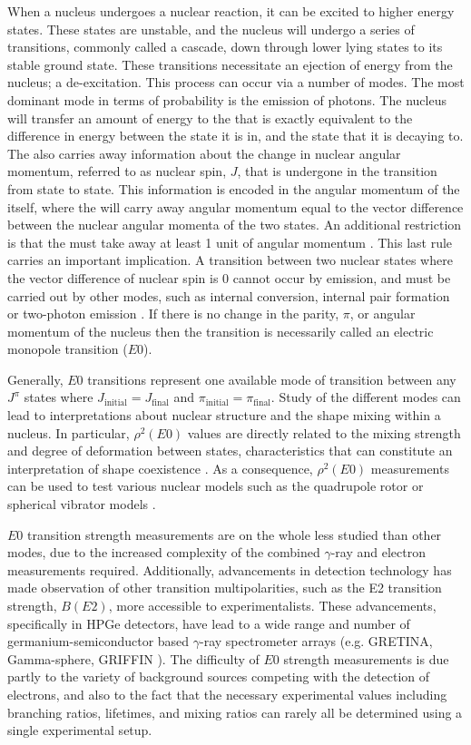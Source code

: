 When a nucleus undergoes a nuclear reaction, it can be excited to higher energy states. These states are unstable, and the nucleus will undergo a series of transitions, commonly called a cascade, down through lower lying states to its stable ground state. These transitions necessitate an ejection of energy from the nucleus; a de-excitation. This process can occur via a number of modes. The most dominant mode in terms of probability is the emission of \gr photons. The nucleus will transfer an amount of energy to the \gr that is exactly equivalent to the difference in energy between the state it is in, and the state that it is decaying to. The \gr also carries away information about the change in nuclear angular momentum, referred to as nuclear spin, $J$, that is undergone in the transition from state to state. This information is encoded in the angular momentum of the \gr itself, where the \gr will carry away angular momentum equal to the vector difference between the nuclear angular momenta of the two states. An additional restriction is that the \gr must take away at least 1 unit of angular momentum \cite{KraneText}. This last rule carries an important implication. A transition between two nuclear states where the vector difference of nuclear spin is 0 cannot occur by \gr emission, and must be carried out by other modes, such as internal conversion, internal pair formation or two-photon emission \cite{Kibedi2005,Rose1949,Henderson2014}. If there is no change in the parity, $\pi$, or angular momentum of the nucleus then the transition is necessarily called an electric monopole transition ($E0$). 

Generally, $E0$ transitions represent one available mode of transition between any $J^\pi$ states where $J_\mathrm{initial} = J_\mathrm{final}$ and $\pi_\mathrm{initial} = \pi_\mathrm{final}$. Study of the different modes can lead to interpretations about nuclear structure and the shape mixing within a nucleus. In particular, $\rho^2(E0)$ values are directly related to the mixing strength and degree of deformation between states, characteristics that can constitute an interpretation of shape coexistence \cite{Wood2011,Ilie2011}. As a consequence, $\rho^2(E0)$ measurements can be used to test various nuclear models such as the quadrupole rotor or spherical vibrator models \cite{Wood1999}. 

$E0$ transition strength measurements are on the whole less studied than other modes, due to the increased complexity of the combined $\gamma$-ray and electron measurements required. Additionally, advancements in \gr detection technology has made observation of other transition multipolarities, such as the E2 transition strength, $B(E2)$, more accessible to experimentalists. These advancements, specifically in HPGe detectors, have lead to a wide range and number of germanium-semiconductor based $\gamma$-ray spectrometer arrays (e.g. GRETINA, Gamma-sphere, GRIFFIN \cite{Paschalis2013,Lee1990,Svensson2013}). The difficulty of $E0$ strength measurements is due partly to the variety of background sources competing with the detection of electrons, and also to the fact that the necessary experimental values including branching ratios, lifetimes, and mixing ratios can rarely all be determined using a single experimental setup. 


